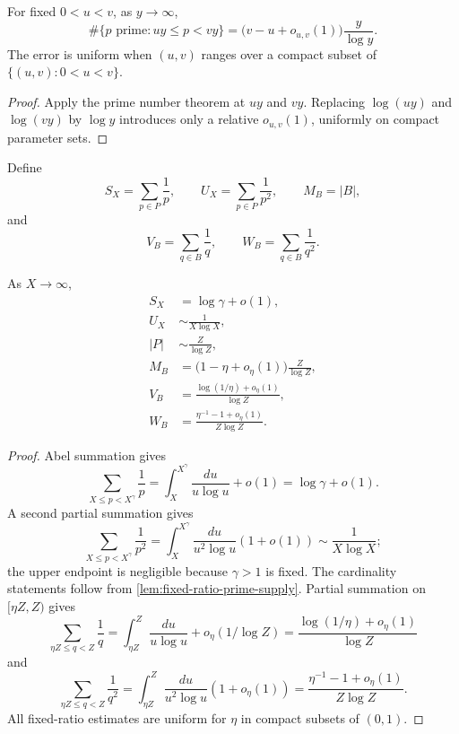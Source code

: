 \begin{lemma}
\label{lem:fixed-ratio-prime-supply}
For fixed $0<u<v$, as $y\to\infty$,
\[
 \#\{p\text{ prime}:uy\leq p<vy\}
 =\bigl(v-u+o_{u,v}(1)\bigr)\frac{y}{\log y}.
\]
The error is uniform when $(u,v)$ ranges over a compact subset of $\{(u,v):0<u<v\}$.
\end{lemma}

\begin{proof}
Apply the prime number theorem at $uy$ and $vy$.  Replacing $\log(uy)$ and $\log(vy)$ by $\log y$ introduces only a relative $o_{u,v}(1)$, uniformly on compact parameter sets.
\end{proof}

Define
\[
 S_X=\sum_{p\in P}\frac1p,
 \qquad
 U_X=\sum_{p\in P}\frac1{p^2},
 \qquad
 M_B=|B|,
\]
and
\[
 V_B=\sum_{q\in B}\frac1q,
 \qquad
 W_B=\sum_{q\in B}\frac1{q^2}.
\]

\begin{lemma}
\label{lem:reciprocal-prime-estimates}
As $X\to\infty$,
\begin{align}
 S_X&=\log\gamma+o(1),
 \label{eq:SX-asymptotic}\\
 U_X&\sim\frac1{X\log X},
 \label{eq:UX-asymptotic}\\
 |P|&\sim\frac{Z}{\log Z},
 \label{eq:P-cardinality}\\
 M_B&=\bigl(1-\eta+o_\eta(1)\bigr)\frac{Z}{\log Z},
 \label{eq:B-cardinality}\\
 V_B&=\frac{\log(1/\eta)+o_\eta(1)}{\log Z},
 \label{eq:B-reciprocal-mass}\\
 W_B&=\frac{\eta^{-1}-1+o_\eta(1)}{Z\log Z}.
 \label{eq:B-power-sums}
\end{align}
\end{lemma}

\begin{proof}
Abel summation gives
\[
 \sum_{X\leq p<X^\gamma}\frac1p
 =\int_X^{X^\gamma}\frac{du}{u\log u}+o(1)
 =\log\gamma+o(1).
\]
A second partial summation gives
\[
 \sum_{X\leq p<X^\gamma}\frac1{p^2}
 =\int_X^{X^\gamma}\frac{du}{u^2\log u}(1+o(1))
 \sim\frac1{X\log X};
\]
the upper endpoint is negligible because $\gamma>1$ is fixed.  The cardinality statements follow from \cref{lem:fixed-ratio-prime-supply}.  Partial summation on $[\eta Z,Z)$ gives
\[
 \sum_{\eta Z\leq q<Z}\frac1q
 =\int_{\eta Z}^{Z}\frac{du}{u\log u}+o_\eta(1/\log Z)
 =\frac{\log(1/\eta)+o_\eta(1)}{\log Z}
\]
and
\[
 \sum_{\eta Z\leq q<Z}\frac1{q^2}
 =\int_{\eta Z}^{Z}\frac{du}{u^2\log u}(1+o_\eta(1))
 =\frac{\eta^{-1}-1+o_\eta(1)}{Z\log Z}.
\]
All fixed-ratio estimates are uniform for $\eta$ in compact subsets of $(0,1)$.
\end{proof}

